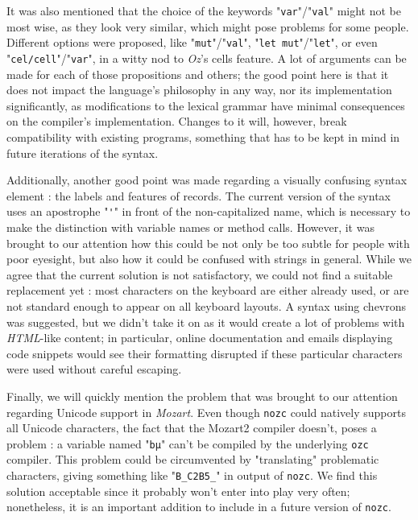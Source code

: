It was also mentioned that the choice of the keywords "\texttt{var}"/"\texttt{val}" might not be most wise, as they look very similar, which might pose problems for some people.
Different options were proposed, like "\texttt{mut}"/"\texttt{val}", "\texttt{let mut}"/"\texttt{let}", or even "\texttt{cel/cell}"/"\texttt{var}", in a witty nod to \textit{Oz}'s cells feature.
A lot of arguments can be made for each of those propositions and others;
the good point here is that it does not impact the language's philosophy in any way, nor its implementation significantly, as modifications to the lexical grammar have minimal consequences on the compiler's implementation.
Changes to it will, however, break compatibility with existing programs, something that has to be kept in mind in future iterations of the syntax.

Additionally, another good point was made regarding a visually confusing syntax element : the labels and features of records.
The current version of the syntax uses an apostrophe "\texttt{\'}" in front of the non-capitalized name, which is necessary to make the distinction with variable names or method calls.
However, it was brought to our attention how this could be not only be too subtle for people with poor eyesight, but also how it could be confused with strings in general.
While we agree that the current solution is not satisfactory, we could not find a suitable replacement yet : most characters on the keyboard are either already used, or are not standard enough to appear on all keyboard layouts.
A syntax using chevrons was suggested, but we didn't take it on as it would create a lot of problems with \textit{HTML}-like content;
in particular, online documentation and emails displaying code snippets would see their formatting disrupted if these particular characters were used without careful escaping.\newline

Finally, we will quickly mention the problem that was brought to our attention regarding Unicode support in \textit{Mozart}.
Even though \texttt{nozc} could natively supports all Unicode characters, the fact that the Mozart2 compiler doesn't, poses a problem : a variable named "\texttt{bµ}" can't be compiled by the underlying \texttt{ozc} compiler.
This problem could be circumvented by "translating" problematic characters, giving something like "\texttt{B\_C2B5\_}" in output of \texttt{nozc}.
We find this solution acceptable since it probably won't enter into play very often;
nonetheless, it is an important addition to include in a future version of \texttt{nozc}.

